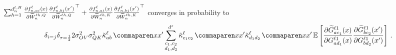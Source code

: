 \begin{lemma}\label{lem:wqk_ntk}
$
    \sum_{h = 1}^{d_{n}^{\ell, H}}
        \frac{
            \partial {f}^{\ell}_{n, a i}{(x)}
        }{
            \partial \widetilde{W}_n^{\ell h, Q}
        }
        \frac{
            \partial {f}^{\ell}_{n, b j}{(x')}
        }{
            \partial \widetilde{W}_n^{\ell h, Q}
        }^\top
        +
        \frac{
            \partial {f}^{\ell}_{n, a i}{(x)}
        }{
            \partial \widetilde{W}_n^{\ell h, K}
        }
        \frac{
            \partial {f}^{\ell}_{n, b j}{(x')}
        }{
            \partial \widetilde{W}_n^{\ell h, K}
        }^\top
    $
    converges in probability to
    $$
    \delta_{i = j}
    \delta_{\scaling = \frac{1}{2}}
    2
    \OVVar
    \QKVar
    \kerntildef{a b}{\depthSymbol}{\inputSymbol}{\inputSymbol'}
    \sum_{\substack{c_1, c_2 \\ d_1 , d_2}}^{\spatialDimension}
        \kerntildef{c_1 c_2}{\depthSymbol}{\inputSymbol}{\inputSymbol'}
        \kerntildef{d_1 d_2}{
        \depthSymbol}{\inputSymbol}{\inputSymbol'}
        \E \left[
            \frac{
                \partial
                \tildeLogitN{\fIndexA c_1}{\depthSymbol 1}{\inputSymbol}
            }{
                \partial
                \logitSymbol_{\fIndexA d_1}^{\depthSymbol 1}(\inputSymbol)
            }
            \frac{
                \partial
                \tildeLogitN{\fIndexB c_2}{\depthSymbol 1}{\inputSymbol'}
            }{
                \partial
                \logitSymbol_{\fIndexB d_2}^{\depthSymbol 1}(\inputSymbol')
            }
        \right]
    \, .
    $$
\end{lemma}


